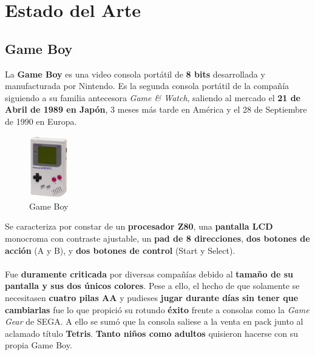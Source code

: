 
\chapter{Estado del Arte}
\label{gb}

\section{Game Boy}
La \textbf{Game Boy} es una video consola portátil de \textbf{8 bits} desarrollada y manufacturada por Nintendo. Es la segunda consola portátil de la compañía siguiendo a su familia antecesora \textit{Game \& Watch}, saliendo al mercado el \textbf{21 de Abril de 1989 en Japón}, 3 meses más tarde en América y el 28 de Septiembre de 1990 en Europa. \\

\begin{figure}[h]
\centering
\includegraphics[width=0.15\textwidth]{include/images/GameBoy/Game-Boy-Original.jpg}
\caption{Game Boy}
\label{figure:mt_gameboy}
\end{figure}

Se caracteriza por constar de un \textbf{procesador Z80}, una \textbf{pantalla LCD} monocroma con contraste ajustable, un \textbf{pad de 8 direcciones}, \textbf{dos botones de acción} (A y B), y \textbf{dos botones de control} (Start y Select). \\ \\
Fue \textbf{duramente criticada} por diversas compañías debido al \textbf{tamaño de su pantalla y sus dos únicos colores}. Pese a ello, el hecho de que solamente se necesitasen \textbf{cuatro pilas AA} y pudieses \textbf{jugar durante días sin tener que cambiarlas} fue lo que propició su rotundo \textbf{éxito} frente a consolas como la \textit{Game Gear} de SEGA. A ello se sumó que la consola saliese a la venta en pack junto al aclamado título \textbf{Tetris}. \textbf{Tanto niños como adultos} quisieron hacerse con su propia Game Boy. \\

